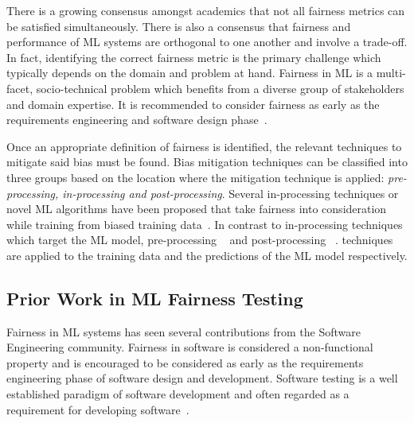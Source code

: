 \documentclass{article}
\begin{document}
There is a growing consensus amongst academics that not all fairness
metrics can be satisfied simultaneously. There is also a consensus
that fairness and performance of ML systems are orthogonal to one
another and involve a trade-off. In fact, identifying the correct
fairness metric is the primary challenge which typically depends on
the domain and problem at hand. Fairness in ML is a multi-facet,
socio-technical problem which benefits from a diverse group of
stakeholders and domain expertise. It is recommended to consider
fairness as early as the requirements engineering and software design
phase \cite{zhang2020machine,chen2022fairness,mehrabi2021survey,zhang2021ignorance}.

Once an appropriate definition of fairness is identified, the relevant
techniques to mitigate said bias must be found. Bias mitigation
techniques can be classified into three groups based on the location
where the mitigation technique is applied: \emph{pre-processing,
in-processing and post-processing}. Several in-processing techniques
or novel ML algorithms have been proposed that take fairness into
consideration while training from biased training
data \cite{zhang2018mitigating,agarwal2018reductions,kearns2018preventing,kearns2019empirical,kamishima2012fairness}.
In contrast to in-processing techniques which target the ML model,
pre-processing
 \cite{feldman2015certifying,zemel2013learning,calmon2017optimized,kamiran2012data}
and post-processing
 \cite{pleiss2017fairness,hardt2016equality,kamiran2012decision}.
techniques are applied to the training data and the predictions of the
ML model respectively.

\subsection{Prior Work in ML Fairness Testing}\label{sec:prior-work}

Fairness in ML systems has seen several contributions from the
Software Engineering community. Fairness in software is considered a
non-functional property and is encouraged to be considered as early as
the requirements engineering phase of software design and development.
Software testing is a well established paradigm of software
development and often regarded as a requirement for developing
software \cite{zhang2020machine}.
\end{document}
